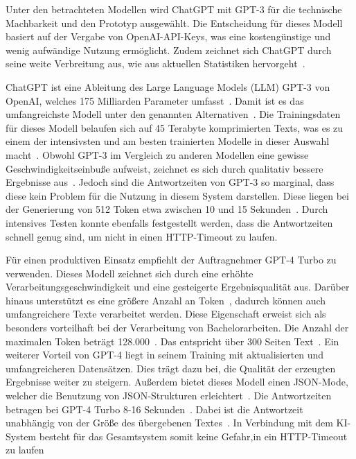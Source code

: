Unter den betrachteten Modellen wird ChatGPT mit GPT-3 für die technische Machbarkeit und den Prototyp ausgewählt.
Die Entscheidung für dieses Modell basiert auf der Vergabe von OpenAI-API-Keys, was eine kostengünstige und wenig aufwändige Nutzung ermöglicht.
Zudem zeichnet sich ChatGPT durch seine weite Verbreitung aus, wie aus aktuellen Statistiken hervorgeht~\autocite{statista.gpt}.

ChatGPT ist eine Ableitung des Large Language Models (LLM) GPT-3 von OpenAI, welches 175 Milliarden Parameter umfasst~\autocite[][S. 5]{openai.gpt}.
Damit ist es das umfangreichste Modell unter den genannten Alternativen~\autocite{statista.gpt}.
Die Trainingsdaten für dieses Modell belaufen sich auf 45 Terabyte komprimierten Texts, was es zu einem der intensivsten und am besten trainierten Modelle in dieser Auswahl macht~\autocite[][S. 8]{openai.gpt}.
Obwohl GPT-3 im Vergleich zu anderen Modellen eine gewisse Geschwindigkeitseinbuße aufweist, zeichnet es sich durch qualitativ bessere Ergebnisse aus~\autocite{mindsdb.llm}.
Jedoch sind die Antwortzeiten von GPT-3 so marginal, dass diese kein Problem für die Nutzung in diesem System darstellen.
Diese liegen bei der Generierung von 512 Token etwa zwischen 10 und 15 Sekunden~\autocite{gptforwork.gpt3}.
Durch intensives Testen konnte ebenfalls festgestellt werden, dass die Antwortzeiten schnell genug sind, um nicht in einen HTTP-Timeout zu laufen.

Für einen produktiven Einsatz empfiehlt der Auftragnehmer GPT-4 Turbo zu verwenden.
Dieses Modell zeichnet sich durch eine erhöhte Verarbeitungsgeschwindigkeit und eine gesteigerte Ergebnisqualität aus.
Darüber hinaus unterstützt es eine größere Anzahl an Token~\autocite{openai.gpt4}, dadurch können auch umfangreichere Texte verarbeitet werden.
Diese Eigenschaft erweist sich als besonders vorteilhaft bei der Verarbeitung von Bachelorarbeiten.
Die Anzahl der maximalen Token beträgt 128.000~\autocite{openai.gpt4}.
Das entspricht über 300 Seiten Text~\autocite{openai.blog.gpt4}.
Ein weiterer Vorteil von GPT-4 liegt in seinem Training mit aktualisierten und umfangreicheren Datensätzen.
Dies trägt dazu bei, die Qualität der erzeugten Ergebnisse weiter zu steigern.
Außerdem bietet dieses Modell einen \ac{JSON}-Mode, welcher die Benutzung von \ac{JSON}-Strukturen erleichtert~\autocite{openai.gpt4}.
Die Antwortzeiten betragen bei GPT-4 Turbo 8-16 Sekunden~\autocite{nuvalence.gpt4}.
Dabei ist die Antwortzeit unabhängig von der Größe des übergebenen Textes~\autocite{nuvalence.gpt4}.
In Verbindung mit dem KI-System besteht für das Gesamtsystem somit keine Gefahr,in ein HTTP-Timeout zu laufen

